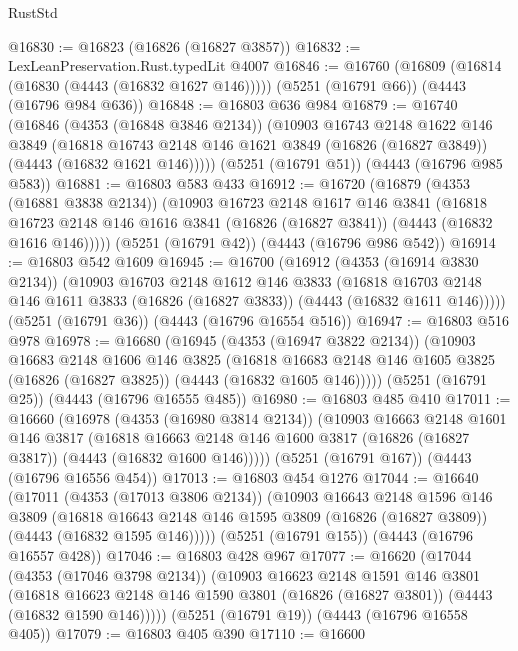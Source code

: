 \begin{lexlean}{RustStd}
\begin{coremodule}
@16830 := @16823 (@16826 (@16827 @3857))
@16832 := LexLeanPreservation.Rust.typedLit @4007
@16846 := @16760
    (@16809 (@16814 (@16830 (@4443 (@16832 @1627 @146)))))
    (@5251 (@16791 @66))
    (@4443 (@16796 @984 @636))
@16848 := @16803 @636 @984
@16879 := @16740
    (@16846
      (@4353 (@16848 @3846 @2134))
      (@10903
        @16743
        @2148
        @1622
        @146
        @3849
        (@16818 @16743 @2148 @146 @1621 @3849 (@16826 (@16827 @3849)) (@4443 (@16832 @1621 @146)))))
    (@5251 (@16791 @51))
    (@4443 (@16796 @985 @583))
@16881 := @16803 @583 @433
@16912 := @16720
    (@16879
      (@4353 (@16881 @3838 @2134))
      (@10903
        @16723
        @2148
        @1617
        @146
        @3841
        (@16818 @16723 @2148 @146 @1616 @3841 (@16826 (@16827 @3841)) (@4443 (@16832 @1616 @146)))))
    (@5251 (@16791 @42))
    (@4443 (@16796 @986 @542))
@16914 := @16803 @542 @1609
@16945 := @16700
    (@16912
      (@4353 (@16914 @3830 @2134))
      (@10903
        @16703
        @2148
        @1612
        @146
        @3833
        (@16818 @16703 @2148 @146 @1611 @3833 (@16826 (@16827 @3833)) (@4443 (@16832 @1611 @146)))))
    (@5251 (@16791 @36))
    (@4443 (@16796 @16554 @516))
@16947 := @16803 @516 @978
@16978 := @16680
    (@16945
      (@4353 (@16947 @3822 @2134))
      (@10903
        @16683
        @2148
        @1606
        @146
        @3825
        (@16818 @16683 @2148 @146 @1605 @3825 (@16826 (@16827 @3825)) (@4443 (@16832 @1605 @146)))))
    (@5251 (@16791 @25))
    (@4443 (@16796 @16555 @485))
@16980 := @16803 @485 @410
@17011 := @16660
    (@16978
      (@4353 (@16980 @3814 @2134))
      (@10903
        @16663
        @2148
        @1601
        @146
        @3817
        (@16818 @16663 @2148 @146 @1600 @3817 (@16826 (@16827 @3817)) (@4443 (@16832 @1600 @146)))))
    (@5251 (@16791 @167))
    (@4443 (@16796 @16556 @454))
@17013 := @16803 @454 @1276
@17044 := @16640
    (@17011
      (@4353 (@17013 @3806 @2134))
      (@10903
        @16643
        @2148
        @1596
        @146
        @3809
        (@16818 @16643 @2148 @146 @1595 @3809 (@16826 (@16827 @3809)) (@4443 (@16832 @1595 @146)))))
    (@5251 (@16791 @155))
    (@4443 (@16796 @16557 @428))
@17046 := @16803 @428 @967
@17077 := @16620
    (@17044
      (@4353 (@17046 @3798 @2134))
      (@10903
        @16623
        @2148
        @1591
        @146
        @3801
        (@16818 @16623 @2148 @146 @1590 @3801 (@16826 (@16827 @3801)) (@4443 (@16832 @1590 @146)))))
    (@5251 (@16791 @19))
    (@4443 (@16796 @16558 @405))
@17079 := @16803 @405 @390
@17110 := @16600

\end{coremodule}
\end{lexlean}
